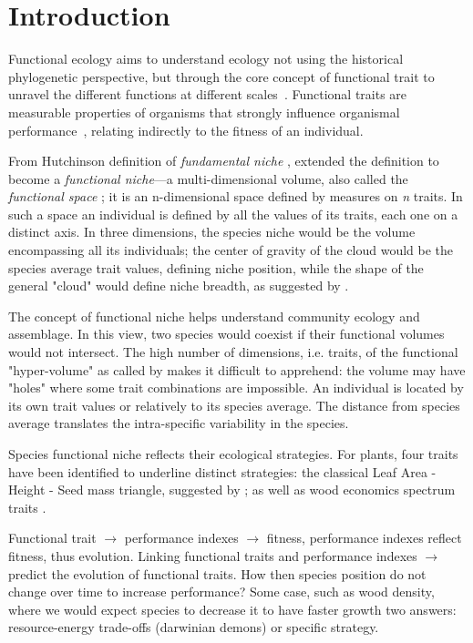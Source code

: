 \label{sec:Intro}
\section*{Introduction}
Functional ecology aims to understand ecology not using the historical phylogenetic perspective, but through the core concept of functional trait to unravel the different functions at different scales~\citep{mcgill_rebuilding_2006}. Functional traits are measurable properties of organisms that strongly influence organismal performance~\citep{mcgill_rebuilding_2006}, relating indirectly to the fitness of an individual.

From Hutchinson definition of \emph{fundamental niche} \citep{hutchinson_concluding_1957}, \citet{violle_towards_2009} extended the definition to become a \emph{functional niche}—a multi-dimensional volume, also called the \emph{functional space} ; it is an n-dimensional space defined by measures on \emph{n} traits. In such a space an individual is defined by all the values of its traits, each one on a distinct axis. In three dimensions, the species niche would be the volume encompassing all its individuals; the center of gravity of the cloud would be the species average trait values, defining niche position, while the shape of the general "cloud" would define niche breadth, as suggested by \citet{violle_towards_2009}.

The concept of functional niche helps understand community ecology and assemblage. In this view, two species would coexist if their functional volumes would not intersect. The high number of dimensions, i.e. traits, of the functional "hyper-volume" as called by \cite{NEEDED} makes it difficult to apprehend: the volume may have "holes" where some trait combinations are impossible. An individual is located by its own trait values or relatively to its species average. The distance from species average translates the intra-specific variability in the species.

Species functional niche reflects their ecological strategies. For plants, four traits have been identified to underline distinct strategies: the classical Leaf Area - Height - Seed mass triangle, suggested by \cite{NEEDED}; as well as wood economics spectrum traits \citep{baraloto_decoupled_2010}.

Functional trait $\rightarrow$ performance indexes $\rightarrow$ fitness, performance indexes reflect fitness, thus evolution. Linking functional traits and performance indexes $\rightarrow$ predict the evolution of functional traits. How then species position do not change over time to increase performance? Some case, such as wood density, where we would expect species to decrease it to have faster growth two answers: resource-energy trade-offs (darwinian demons) or specific strategy. 

